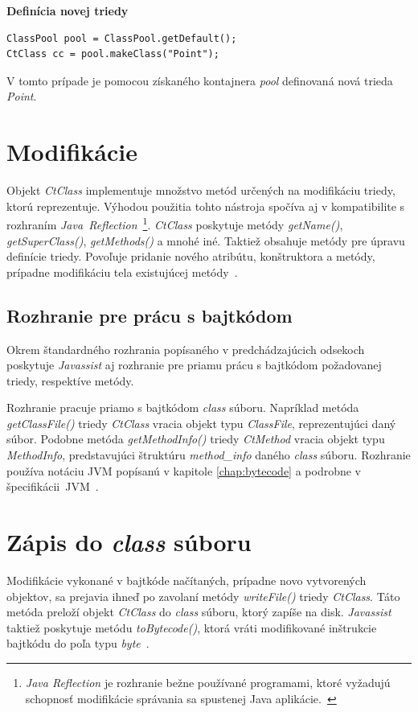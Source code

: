 \documentclass[11pt,final,oneside]{fithesis}
\newenvironment{example}[1]
{
\vspace{3mm}
\noindent\textbf{#1}
\vspace{2mm}
}
{
\vspace{3mm}
}
\begin{document}
\begin{example}{Definícia novej triedy}
\begin{verbatim}
ClassPool pool = ClassPool.getDefault();
CtClass cc = pool.makeClass("Point");
\end{verbatim}
\end{example}

V tomto prípade je pomocou získaného kontajnera \textit{pool} definovaná nová 
trieda \textit{Point}. 

\section{Modifikácie}
\label{sec:mod}
Objekt \textit{CtClass} implementuje množstvo metód určených na modifikáciu triedy, 
ktorú reprezentuje. Výhodou použitia tohto nástroja spočíva aj v kompatibilite 
s rozhraním \textit{Java~Reflection}~\footnote{\textit{Java Reflection} je 
rozhranie bežne používané programami, ktoré vyžadujú schopnosť modifikácie 
správania sa spustenej Java aplikácie.~\cite{Oracle:JavaReflection}}.
\textit{CtClass} poskytuje metódy \textit{getName()}, \textit{getSuperClass()},
\textit{getMethods()} a mnohé iné. Taktiež obsahuje metódy pre úpravu definície
triedy. Povoľuje pridanie nového atribútu, konštruktora a metódy, prípadne 
modifikáciu tela existujúcej metódy~\cite{Chiba:Javassist}.

\subsection{Rozhranie pre prácu s bajtkódom}
Okrem štandardného rozhrania popísaného v predchádzajúcich odsekoch poskytuje 
\textit{Javassist} aj rozhranie pre priamu prácu s bajtkódom požadovanej 
triedy, respektíve metódy.

Rozhranie pracuje priamo s bajtkódom \textit{class} súboru. Napríklad metóda 
\textit{getClassFile()} triedy \textit{CtClass} vracia objekt typu 
\textit{ClassFile}, reprezentujúci daný súbor. Podobne metóda 
\textit{getMethodInfo()} triedy \textit{CtMethod} vracia objekt typu
\textit{MethodInfo}, predstavujúci štruktúru \textit{method\_info} daného 
\textit{class} súboru. Rozhranie používa notáciu JVM popísanú v kapitole 
\ref{chap:bytecode} a podrobne v
špecifikácii~JVM~\cite{Lindholm:2013:JVM:2462629}.

\section{Zápis do \textit{class} súboru}
Modifikácie vykonané v bajtkóde načítaných, prípadne novo vytvorených 
objektov, sa prejavia ihneď po zavolaní metódy \textit{writeFile()} triedy
\textit{CtClass}. Táto metóda preloží objekt \textit{CtClass} do \textit{class}
súboru, ktorý zapíše na disk. \textit{Javassist} taktiež poskytuje metódu 
\textit{toBytecode()}, ktorá vráti modifikované inštrukcie bajtkódu do poľa 
typu \textit{byte}~\cite{Chiba:Javassist}.
\end{document}
